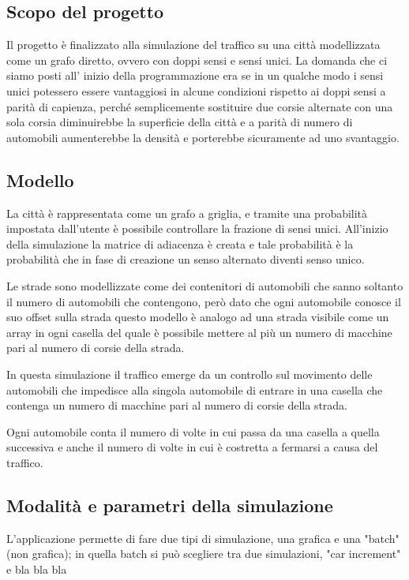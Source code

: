 \documentclass[main.tex]{subfiles}
\begin{document}
\subsection{Scopo del progetto}

Il progetto è finalizzato alla simulazione del traffico su una città modellizzata come un grafo diretto, ovvero con doppi sensi e sensi unici.
La domanda che ci siamo posti all' inizio della programmazione era se in un qualche modo i sensi unici potessero essere vantaggiosi in alcune condizioni
rispetto ai doppi sensi a parità di capienza, perché semplicemente sostituire due corsie alternate con una sola corsia diminuirebbe la superficie della città
e a parità di numero di automobili aumenterebbe la densità e porterebbe sicuramente ad uno svantaggio.

\subsection{Modello}

La città è rappresentata come un grafo a griglia, e tramite una probabilità impostata dall'utente è possibile controllare la frazione di sensi unici.
All'inizio della simulazione la matrice di adiacenza è creata e tale probabilità è la probabilità che in fase di creazione un senso alternato diventi senso unico.

Le strade sono modellizzate come dei contenitori di automobili che sanno soltanto il numero di automobili che contengono, però dato che ogni automobile conosce il suo offset sulla strada
questo modello è analogo ad una strada visibile come un array in ogni casella del quale è possibile mettere al più un numero di macchine pari al numero di corsie della strada.

In questa simulazione il traffico emerge da un controllo sul movimento delle automobili che impedisce
alla singola automobile di entrare in una casella che contenga un numero di macchine pari al numero di corsie della strada.

Ogni automobile conta il numero di volte in cui passa da una casella a quella successiva e anche il numero di volte in cui
è costretta a fermarsi a causa del traffico.

\subsection{Modalità e parametri della simulazione }

L'applicazione permette di fare due tipi di simulazione, una grafica e una "batch" (non grafica); in quella batch si può scegliere tra due simulazioni, "car increment" e bla bla bla
\end{document}
